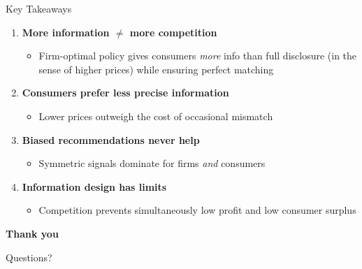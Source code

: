 \documentclass[aspectratio=169, 11pt]{beamer}
\begin{document}
\begin{frame}{Key Takeaways}

\begin{enumerate}
    \item \textbf{More information $\neq$ more competition}
    \begin{itemize}
        \item Firm-optimal policy gives consumers \emph{more} info than full disclosure (in the sense of higher prices) while ensuring perfect matching
    \end{itemize}

    \bigskip

    \item \textbf{Consumers prefer less precise information}
    \begin{itemize}
        \item Lower prices outweigh the cost of occasional mismatch
    \end{itemize}

    \bigskip

    \item \textbf{Biased recommendations never help}
    \begin{itemize}
        \item Symmetric signals dominate for firms \emph{and} consumers
    \end{itemize}

    \bigskip

    \item \textbf{Information design has limits}
    \begin{itemize}
        \item Competition prevents simultaneously low profit and low consumer surplus
    \end{itemize}
\end{enumerate}

\end{frame}

\begin{frame}
\centering
\vfill
{\Large \textbf{Thank you}}

\bigskip

{\large Questions?}
\vfill
\end{frame}
\end{document}
